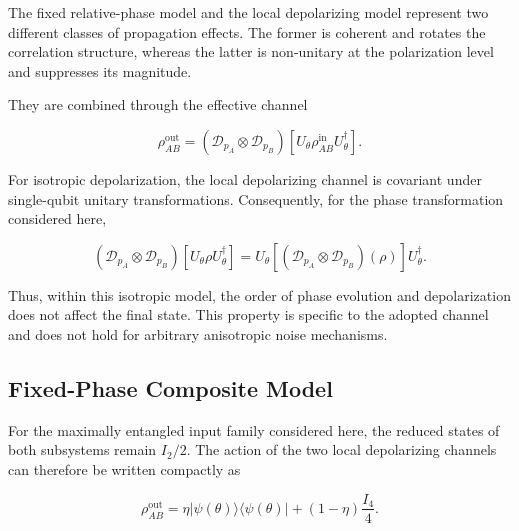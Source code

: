 The fixed relative-phase model and the local depolarizing model represent two
different classes of propagation effects. The former is coherent and rotates the
correlation structure, whereas the latter is non-unitary at the polarization level
and suppresses its magnitude.

They are combined through the effective channel

\begin{equation}
\rho_{AB}^{\mathrm{out}}
=
\left(
\mathcal{D}_{p_A}
\otimes
\mathcal{D}_{p_B}
\right)
\left[
U_\theta
\rho_{AB}^{\mathrm{in}}
U_\theta^\dagger
\right].
\label{eq:composite_fiber_channel}
\end{equation}

For isotropic depolarization, the local depolarizing channel is covariant under
single-qubit unitary transformations. Consequently, for the phase transformation
considered here,

\begin{equation}
\left(
\mathcal{D}_{p_A}\otimes\mathcal{D}_{p_B}
\right)
\left[
U_\theta\rho U_\theta^\dagger
\right]
=
U_\theta
\left[
\left(
\mathcal{D}_{p_A}\otimes\mathcal{D}_{p_B}
\right)(\rho)
\right]
U_\theta^\dagger.
\label{eq:phase_depolarization_commutation}
\end{equation}

Thus, within this isotropic model, the order of phase evolution and
depolarization does not affect the final state. This property is specific to the
adopted channel and does not hold for arbitrary anisotropic noise mechanisms.


\subsection{Fixed-Phase Composite Model}
\label{subsec:fixed_phase_composite_model}

For the maximally entangled input family considered here, the reduced states of
both subsystems remain \(I_2/2\). The action of the two local depolarizing channels
can therefore be written compactly as

\begin{equation}
\rho_{AB}^{\mathrm{out}}
=
\eta
|\psi(\theta)\rangle\langle\psi(\theta)|
+
(1-\eta)\frac{I_4}{4}.
\label{eq:fixed_composite_density_matrix_compact}
\end{equation}

